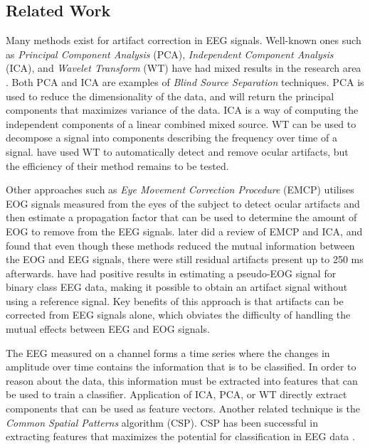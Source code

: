 \subsection{Related Work} \label{sec:relatedwork}
Many methods exist for artifact correction in EEG signals. Well-known ones such as \emph{Principal Component Analysis} (PCA), \emph{Independent Component Analysis} (ICA), and \emph{Wavelet Transform} (WT) have had mixed results in the research area \citep{uriguen2015eeg}. Both PCA and ICA are examples of \emph{Blind Source Separation} techniques. PCA is used to reduce the dimensionality of the data, and will return the principal components that maximizes variance of the data. ICA is a way of computing the independent components of a linear combined mixed source. WT can be used to decompose a signal into components describing the frequency over time of a signal. \cite{krishnaveni2006automatic} have used WT to automatically detect and remove ocular artifacts, but the efficiency of their method remains to be tested.

Other approaches such as \emph{Eye Movement Correction Procedure} (EMCP) \citep{gratton1983new} utilises EOG signals measured from the eyes of the subject to detect ocular artifacts and then estimate a propagation factor that can be used to determine the amount of EOG to remove from the EEG signals. \cite{hoffmann2008correction} later did a review of EMCP and ICA, and found that even though these methods reduced the mutual information between the EOG and EEG signals, there were still residual artifacts present up to 250 ms afterwards. \cite{li2015ocular} have had positive results in estimating a pseudo-EOG signal for binary class EEG data, making it possible to obtain an artifact signal without using a reference signal. Key benefits of this approach is that artifacts can be corrected from EEG signals alone, which obviates the difficulty of handling the mutual effects between EEG and EOG signals.

The EEG measured on a channel forms a time series where the changes in amplitude over time contains the information that is to be classified. In order to reason about the data, this information must be extracted into features that can be used to train a classifier. Application of ICA, PCA, or WT directly extract components that can be used as feature vectors. Another related technique is the \emph{Common Spatial Patterns} algorithm (CSP). CSP has been successful in extracting features that maximizes the potential for classification in EEG data \citep{ang2008filter,ang2012filter}.

